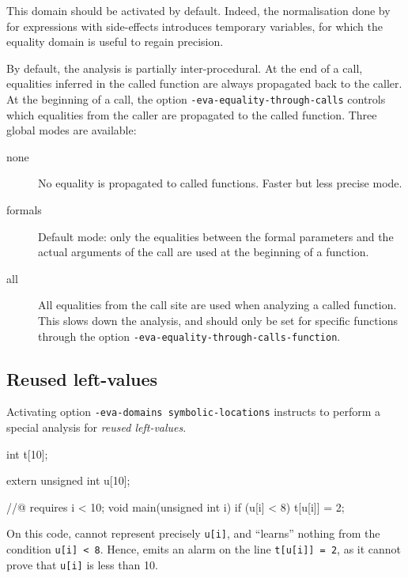 \documentclass{frama-c-book}
\begin{document}
\begin{listing-nonumber}
  int y = x+1;
  // the equality y == x + 1 is inferred
  if (y <= 2) {
    // Thanks to the equality, x <= 1 is deduced
  }
}
\end{listing-nonumber}

This domain should be activated by default. Indeed, the normalisation
done by \FramaC for expressions with side-effects introduces temporary
variables, for which the equality domain is useful to regain
precision.

By default, the analysis is partially inter-procedural.
At the end of a call, equalities inferred in the called function are always
propagated back to the caller.
At the beginning of a call, the option \verb+-eva-equality-through-calls+
controls which equalities from the caller are propagated to the called function.
Three global modes are available:
\begin{description}
\item[none] No equality is propagated to called functions. Faster but less
  precise mode.
\item[formals] Default mode: only the equalities between the formal parameters
  and the actual arguments of the call are used at the beginning
  of a function.
\item[all] All equalities from the call site are used when analyzing a called
  function.  This slows down the analysis, and should only be set for specific
  functions through the option \verb+-eva-equality-through-calls-function+.
\end{description}


\subsection{Reused left-values}
\label{sec:reuse}

Activating option \texttt{-eva-domains symbolic-locations} instructs
\Eva{} to perform a special analysis for \emph{reused left-values}.

\begin{listing-nonumber}
int t[10];

extern unsigned int u[10];

//@ requires i < 10;
void main(unsigned int i) {
  if (u[i] < 8) {
    t[u[i]] = 2;
  }
}
\end{listing-nonumber}
On this code, \Eva{} cannot represent precisely \lstinline+u[i]+, and
``learns'' nothing from the condition \lstinline+u[i] < 8+. Hence, \Eva{}
emits an alarm on the line \lstinline|t[u[i]] = 2|, as it cannot prove
that \lstinline+u[i]+ is less than 10.
\end{document}
